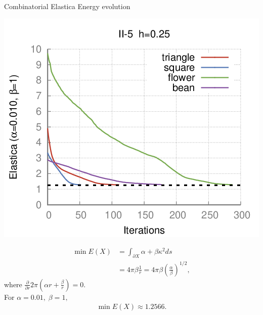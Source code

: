 \begin{frame}
	{Combinatorial Elastica}	
	{Energy evolution}

\begin{minipage}{0.49\textwidth}
\center
\includegraphics[scale=0.3]{figures/combinatorial-elastica/flow/ii/elastica/len_pen_0.01000/jonctions_1/curve_segs_4/best/gs_0.25000/summary-ii5.png}
\end{minipage}
\begin{minipage}{0.5\textwidth}
\small
\begin{align*}
	\min E(X) &= \int_{\partial X}{ \alpha + \beta \kappa^2 ds}\\
	 &= 4\pi \beta \frac{1}{r} = 4\pi \beta \left(\frac{\alpha}{\beta}\right)^{1/2},
\end{align*}
where $\frac{\partial }{\partial r} 2\pi(\alpha r + \frac{\beta}{r}) = 0.$\\ 

%
For $\alpha=0.01,\; \beta=1,$
%
\begin{align*}
	\min E(X) \approx 1.2566.
\end{align*}
\end{minipage}

\vspace{1em}

	
\end{frame}

